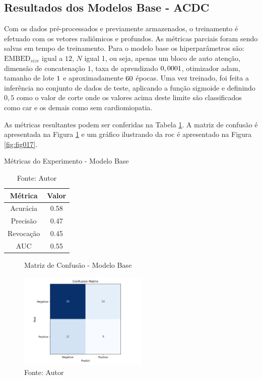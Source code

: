 \subsection{Resultados dos Modelos Base - ACDC}
\label{subsec:resultados_acdc_base}

Com os dados pré-processados e previamente armazenados, o treinamento é efetuado com os vetores radiômicos e profundos. As métricas parciais foram sendo salvas em tempo de treinamento. Para o modelo base os hiperparâmetros são: $\text{EMBED}_{size}$ igual a $12$, $N$ igual 1, ou seja, apenas um bloco de auto atenção, dimensão de concatenação $1$, taxa de aprendizado $0,0001$, otimizador \gls{adam}, tamanho de lote $1$ e aproximadamente $60$ épocas. Uma vez treinado, foi feita a inferência no conjunto de dados de teste, aplicando a função sigmoide e definindo $0,5$ como o valor de corte onde os valores acima deste limite são classificados como \gls{car} e os demais como sem cardiomiopatia. 

As métricas resultantes podem ser conferidas na Tabela \ref{tab:metrics}. A matriz de confusão é apresentada na Figura \ref{fig:fig016} e um gráfico ilustrando da \gls{roc} é apresentado na Figura \ref{fig:fig017}.
\newline

\begin{table}[h!]
    \centering
    \caption{Métricas do Experimento - Modelo Base}
    \renewcommand{\arraystretch}{1} %
    \begin{tabular}{|c|c|}
    \hline 
          \textbf{Métrica} & \textbf{Valor} \\ 
    \hline 
        Acurácia & 0.58 \\ 
    \hline 
        Precisão & 0.47 \\ 
    \hline 
        Revocação & 0.45 \\ 
    \hline 
        AUC & 0.55 \\ 
    \hline 
    \end{tabular} 
    \caption*{Fonte: Autor}
    \label{tab:metrics}
\end{table}

\begin{figure}[h!]
    \centering
    \caption{Matriz de Confusão -  Modelo Base}
    \includegraphics[width=0.55\textwidth]{figures/fig016.png}
    \caption*{Fonte: Autor}
    \label{fig:fig016}
\end{figure}

